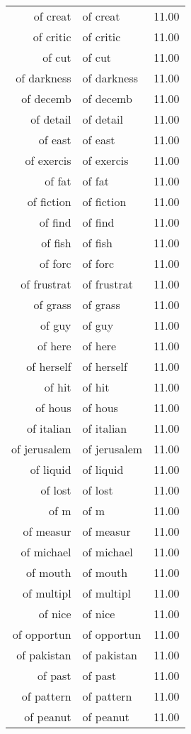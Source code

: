 \begin{table}[ht]
\begin{tabular}{rlr}
  of creat & of creat & 11.00 \\ 
  of critic & of critic & 11.00 \\ 
  of cut & of cut & 11.00 \\ 
  of darkness & of darkness & 11.00 \\ 
  of decemb & of decemb & 11.00 \\ 
  of detail & of detail & 11.00 \\ 
  of east & of east & 11.00 \\ 
  of exercis & of exercis & 11.00 \\ 
  of fat & of fat & 11.00 \\ 
  of fiction & of fiction & 11.00 \\ 
  of find & of find & 11.00 \\ 
  of fish & of fish & 11.00 \\ 
  of forc & of forc & 11.00 \\ 
  of frustrat & of frustrat & 11.00 \\ 
  of grass & of grass & 11.00 \\ 
  of guy & of guy & 11.00 \\ 
  of here & of here & 11.00 \\ 
  of herself & of herself & 11.00 \\ 
  of hit & of hit & 11.00 \\ 
  of hous & of hous & 11.00 \\ 
  of italian & of italian & 11.00 \\ 
  of jerusalem & of jerusalem & 11.00 \\ 
  of liquid & of liquid & 11.00 \\ 
  of lost & of lost & 11.00 \\ 
  of m & of m & 11.00 \\ 
  of measur & of measur & 11.00 \\ 
  of michael & of michael & 11.00 \\ 
  of mouth & of mouth & 11.00 \\ 
  of multipl & of multipl & 11.00 \\ 
  of nice & of nice & 11.00 \\ 
  of opportun & of opportun & 11.00 \\ 
  of pakistan & of pakistan & 11.00 \\ 
  of past & of past & 11.00 \\ 
  of pattern & of pattern & 11.00 \\ 
  of peanut & of peanut & 11.00 \\ 

\end{tabular}
\end{table}
